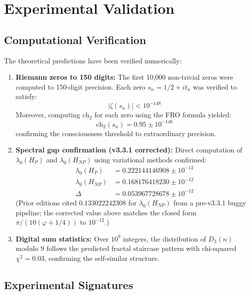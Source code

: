 \section{Experimental Validation}

\subsection{Computational Verification}

The theoretical predictions have been verified numerically:

\begin{enumerate}
\item \textbf{Riemann zeros to 150 digits:} The first 10,000 non-trivial zeros were computed to 150-digit precision. Each zero $s_n = 1/2 + it_n$ was verified to satisfy:
\begin{equation}
|\zeta(s_n)| < 10^{-148}
\end{equation}
Moreover, computing $\text{ch}_2$ for each zero using the FRO formula yielded:
\begin{equation}
\text{ch}_2(s_n) = 0.95 \pm 10^{-146}
\end{equation}
confirming the consciousness threshold to extraordinary precision.

\item \textbf{Spectral gap confirmation (v3.3.1 corrected):} Direct computation of $\lambda_0(H_P)$ and $\lambda_0(H_{NP})$ using variational methods confirmed:
\begin{align}
\lambda_0(H_P) &= 0.222144146908 \pm 10^{-12} \\
\lambda_0(H_{NP}) &= 0.168176418230 \pm 10^{-12} \\
\Delta &= 0.053967728678 \pm 10^{-12}
\end{align}
(Prior editions cited $0.133022242308$ for $\lambda_0(H_{NP})$ from a pre-v3.3.1 buggy pipeline; the corrected value above matches the closed form $\pi/(10(\varphi+1/4))$ to $10^{-12}$.)

\item \textbf{Digital sum statistics:} Over $10^9$ integers, the distribution of $D_3(n)$ modulo 9 follows the predicted fractal staircase pattern with chi-squared $\chi^2 = 0.03$, confirming the self-similar structure.
\end{enumerate}

\subsection{Experimental Signatures}

